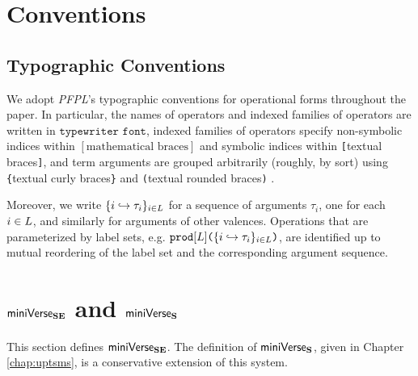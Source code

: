 \appendix
\chapter{Conventions}
\section{Typographic Conventions}\label{appendix:typographic-conventions}
We adopt \emph{PFPL}'s typographic conventions for operational forms throughout the paper. In particular, the names of operators and indexed families of operators are written in $\texttt{typewriter font}$, indexed families of operators specify non-symbolic indices within $[\text{mathematical braces}]$ and symbolic indices within \texttt{[}textual braces\texttt{]}, and term arguments are grouped arbitrarily (roughly, by sort) using \texttt{\{}textual curly braces\texttt{\}} and \texttt{(}textual rounded braces\texttt{)} \cite{pfpl}. 

Moreover, we write $\{i \hookrightarrow \tau_{i}\}_{i \in L}$ for a sequence of arguments $\tau_i$, one for each $i\in L$, and similarly for arguments of other valences. Operations  that are parameterized by label sets, e.g. $\texttt{prod}[L]\texttt{(}\{i \hookrightarrow \tau_{i}\}_{i \in L}\texttt{)}$, are identified up to mutual reordering of the label set and the corresponding argument sequence. 

\chapter{\texorpdfstring{$\mathsf{miniVerse}_\textbf{SE}$ and $\mathsf{miniVerse}_\textbf{S}$}{miniVerseSE and miniVerseS}}\label{appendix:miniVerseSES}

This section defines $\mathsf{miniVerse}_\textbf{SE}$. The definition of $\mathsf{miniVerse}_\textbf{S}$, given in Chapter \ref{chap:uptsms}, is a conservative extension of this system.


